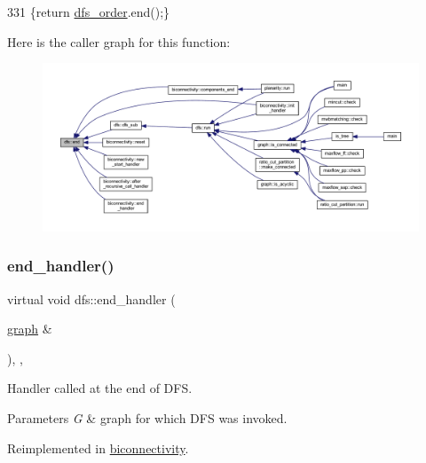 \begin{DoxyCode}
331     \{\textcolor{keywordflow}{return} \mbox{\hyperlink{classdfs_af70a73ace68afd91ef944f984c9f28d5}{dfs\_order}}.end();\}
\end{DoxyCode}
Here is the caller graph for this function\+:
\nopagebreak
\begin{figure}[H]
\begin{center}
\leavevmode
\includegraphics[width=350pt]{classdfs_af847633fa642258d3522e8deb26aef37_icgraph}
\end{center}
\end{figure}
\mbox{\label{classdfs_a59c512fa99ad3809db3e24347ab43b85}} 
\subsubsection{\texorpdfstring{end\+\_\+handler()}{end\_handler()}}
{\footnotesize\ttfamily virtual void dfs\+::end\+\_\+handler (\begin{DoxyParamCaption}\item[{\mbox{\hyperlink{classgraph}{graph}} \&}]{ }\end{DoxyParamCaption})\hspace{0.3cm}{\ttfamily [inline]}, {\ttfamily [virtual]}, {\ttfamily [inherited]}}



Handler called at the end of D\+FS. 


\begin{DoxyParams}{Parameters}
{\em G} & graph for which D\+FS was invoked. \\
\hline
\end{DoxyParams}


Reimplemented in \mbox{\hyperlink{classbiconnectivity_a2583331a4561f3db221ab674d2e5d75e}{biconnectivity}}.



